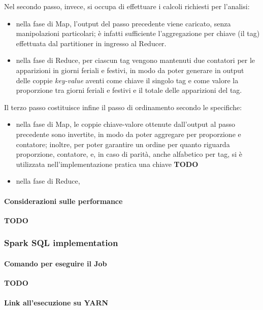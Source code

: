   Nel secondo passo, invece, si occupa di effettuare i calcoli richiesti per l'analisi:
  \begin{itemize}
    \item
      nella fase di Map, l'output del passo precedente viene caricato, senza manipolazioni particolari;
      è infatti sufficiente l'aggregazione per chiave (il tag) effettuata dal partitioner in ingresso al Reducer.
    \item
      nella fase di Reduce, per ciascun tag vengono mantenuti due contatori per le apparizioni in giorni feriali e festivi,
      in modo da poter generare in output delle coppie \textit{key-value} aventi come chiave il singolo tag e come valore la proporzione tra giorni feriali e festivi e il totale delle apparizioni del tag.
  \end{itemize}

  Il terzo passo costituisce infine il passo di ordinamento secondo le specifiche:
  \begin{itemize}
    \item
      nella fase di Map, le coppie chiave-valore ottenute dall'output al passo precedente sono invertite, in modo da poter aggregare per proporzione e contatore;
      inoltre, per poter garantire un ordine per quanto riguarda proporzione, contatore, e, in caso di parità, anche alfabetico per tag,
      si è utilizzata nell'implementazione pratica una chiave \textbf{TODO}
    \item nella fase di Reduce,
  \end{itemize}

  \paragraph{Considerazioni sulle performance}\label{par:job1:mapreduce:performance}

  \textbf{TODO}

  \subsubsection{Spark SQL implementation}\label{subsub:job1:spark}

  \paragraph{Comando per eseguire il Job}\label{par:job1:spark:cmd}

  \textbf{TODO}

  \paragraph{Link all'esecuzione su YARN}\label{par:job1:spark:yarn}

